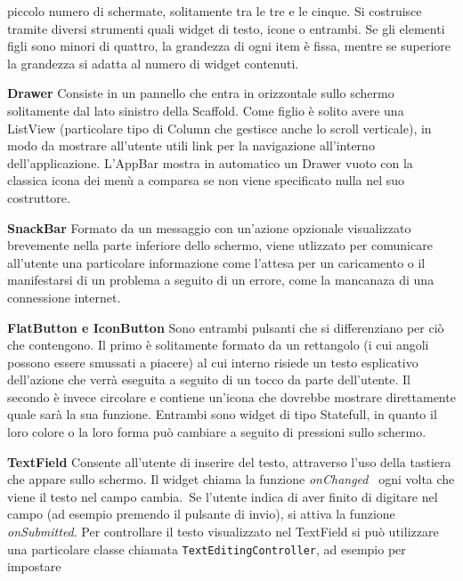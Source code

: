 \begin{trivlist}
		piccolo numero di schermate, solitamente tra le tre e le cinque.
		Si costruisce tramite diversi strumenti quali widget di testo, icone o
		entrambi. Se gli elementi figli sono minori di quattro, la grandezza di
		ogni item è fissa, mentre se superiore la grandezza si adatta al numero
		di widget contenuti.
		\item \textbf{Drawer} \newline
		Consiste in un pannello che entra in orizzontale sullo schermo
		solitamente dal lato sinistro della Scaffold. Come figlio è solito avere
		una ListView (particolare tipo di Column che gestisce anche lo scroll
		verticale), in modo da mostrare all'utente utili link per la navigazione
		all'interno dell'applicazione. L'AppBar mostra in automatico un Drawer
		vuoto con la classica icona dei menù a comparsa se non viene specificato
		nulla nel suo costruttore.
		\item \textbf{SnackBar} \newline
		Formato da un messaggio con un'azione opzionale visualizzato brevemente
		nella parte inferiore dello schermo, viene utlizzato per comunicare
		all'utente una particolare informazione come l'attesa per un caricamento
		o il manifestarsi di un problema a seguito di un errore, come la
		mancanaza di una connessione internet.
		\item \textbf{FlatButton e IconButton} \newline
		Sono entrambi pulsanti che si differenziano per ciò che contengono. Il
		primo è solitamente formato da un rettangolo (i cui angoli possono
		essere smussati a piacere) al cui interno risiede un testo esplicativo
		dell'azione che verrà eseguita a seguito di un tocco da parte
		dell'utente. Il secondo è invece circolare e contiene un'icona che
		dovrebbe mostrare direttamente quale sarà la sua funzione. Entrambi sono
		widget di tipo Statefull, in quanto il loro colore o la loro forma può
		cambiare a seguito di pressioni sullo schermo.
		\item \textbf{TextField} \newline
		Consente all'utente di inserire del testo, attraverso l'uso della
		tastiera che appare sullo schermo. Il widget chiama la funzione
		\textit{onChanged}  ogni volta che viene il testo nel campo cambia. Se
		l'utente indica di aver finito di digitare nel campo (ad esempio
		premendo il pulsante di invio), si attiva
		la funzione \textit{onSubmitted}. Per controllare il testo visualizzato nel
		TextField si può utilizzare una particolare classe chiamata
		\verb|TextEditingController|, ad esempio per impostare

\end{trivlist}
